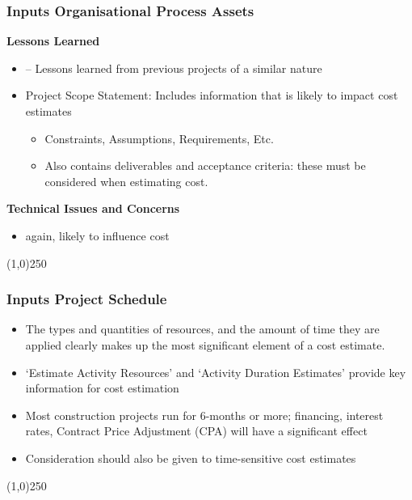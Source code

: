 \begin{frame}
\frametitle{Inputs \hfill\hfill Organisational Process Assets}
\textbf{Lessons Learned}
\begin{itemize}
	\item – Lessons learned from previous projects of a similar nature
	\item Project Scope Statement: Includes information that is likely to impact cost estimates
		\begin{itemize}
			\item Constraints, Assumptions, Requirements, Etc.
			\item Also contains deliverables and acceptance criteria: these must be considered when estimating cost.
		\end{itemize}
\end{itemize}
\textbf{Technical Issues and Concerns}
\begin{itemize}
	\item again, likely to influence cost 
\end{itemize}
\end{frame}
\begin{center}\line(1,0){250}\end{center}







\begin{frame}
\frametitle{Inputs \hfill\hfill Project Schedule}
\begin{itemize}
	\item The types and quantities of resources, and the amount of time they are applied clearly makes up the most significant element of a cost estimate.
	\item ‘Estimate Activity Resources’ and ‘Activity Duration Estimates’ provide key information for cost estimation
	\item Most construction projects run for 6-months or more; financing, interest rates, Contract Price Adjustment (CPA) will have a significant effect
	\item Consideration should also be given to time-sensitive cost estimates  
\end{itemize}
\end{frame}
\begin{center}\line(1,0){250}\end{center}






